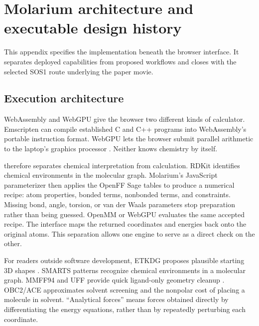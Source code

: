 \section{Molarium architecture and executable design history}
\label{app:architecture}


This appendix specifies the implementation beneath the browser interface. It
separates deployed capabilities from proposed workflows and closes with the
selected SOS1 route underlying the paper movie.

\subsection{Execution architecture}
\label{app:wasm-webgpu}

WebAssembly and WebGPU give the browser two different kinds of calculator.
Emscripten can compile established C and C++ programs into WebAssembly's portable
instruction format. WebGPU lets the browser submit parallel arithmetic to the
laptop's graphics processor
\cite{haas2017webassembly,w3c2025webgpu,w3c2026wgsl}. Neither knows chemistry by
itself.

\molarium{} therefore separates chemical interpretation from calculation. RDKit
identifies chemical environments in the molecular graph. Molarium's JavaScript
parameterizer then applies the OpenFF Sage tables to produce a numerical recipe:
atom properties, bonded terms, nonbonded terms, and constraints. Missing bond,
angle, torsion, or van der Waals parameters stop preparation rather than being
guessed. OpenMM or WebGPU evaluates the same accepted recipe. The interface maps
the returned coordinates and energies back onto the original atoms. This
separation allows one engine to serve as a direct check on the other.

For readers outside software development, ETKDG proposes plausible starting 3D
shapes \cite{riniker2015etkdg,wang2020etkdg}. SMARTS
patterns recognize chemical environments in a molecular graph. MMFF94 and UFF
provide quick ligand-only geometry cleanup
\cite{halgren1996mmff,rappe1992uff}. OBC2/ACE approximates solvent screening and
the nonpolar cost of placing a molecule in solvent. ``Analytical forces'' means
forces obtained directly by differentiating the energy equations, rather than
by repeatedly perturbing each coordinate.

